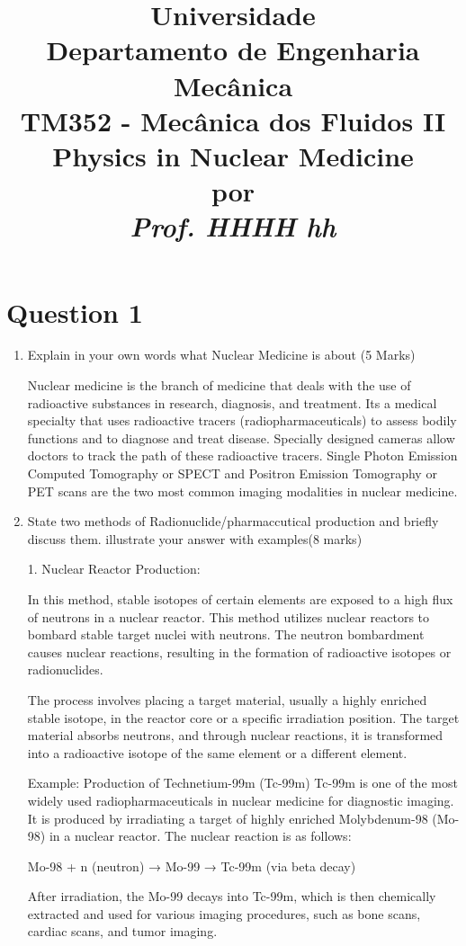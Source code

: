 \documentclass[a4paper,12pt]{article}
\author{}
\date{}
\title{\Large \textbf{Universidade }\\ Departamento de Engenharia Mecânica \\ TM352 - Mecânica dos Fluidos II \\ \vspace{5mm} \LARGE \textbf{Physics in Nuclear Medicine} \\ \vspace{1cm} \normalsize por \\ \vspace{1cm} \Large \textit{Prof. HHHH hh}}
\begin{document}
\maketitle


\section*{Question 1 }
\begin{enumerate}
\item Explain in your own words what Nuclear Medicine is about (5 Marks)

Nuclear medicine is the branch of medicine that deals with the use of radioactive substances in research, diagnosis, and treatment. Its a medical specialty that uses radioactive tracers (radiopharmaceuticals) to assess bodily functions and to diagnose and treat disease. Specially designed cameras allow doctors to track the path of these radioactive tracers. Single Photon Emission Computed Tomography or SPECT and Positron Emission Tomography or PET scans are the two most common imaging modalities in nuclear medicine.

\item State two methods of Radionuclide/pharmaccutical production and briefly discuss them. illustrate your answer with examples(8 marks)


1. Nuclear Reactor Production:

In this method, stable isotopes of certain elements are exposed to a high flux of neutrons in a nuclear reactor. This method utilizes nuclear reactors to bombard stable target nuclei with neutrons.  The neutron bombardment causes nuclear reactions, resulting in the formation of radioactive isotopes or radionuclides.

The process involves placing a target material, usually a highly enriched stable isotope, in the reactor core or a specific irradiation position. The target material absorbs neutrons, and through nuclear reactions, it is transformed into a radioactive isotope of the same element or a different element.

Example: Production of Technetium-99m (Tc-99m)
Tc-99m is one of the most widely used radiopharmaceuticals in nuclear medicine for diagnostic imaging. It is produced by irradiating a target of highly enriched Molybdenum-98 (Mo-98) in a nuclear reactor. The nuclear reaction is as follows:

Mo-98 + n (neutron) → Mo-99 → Tc-99m (via beta decay)

After irradiation, the Mo-99 decays into Tc-99m, which is then chemically extracted and used for various imaging procedures, such as bone scans, cardiac scans, and tumor imaging.



\end{enumerate}
\end{document}
